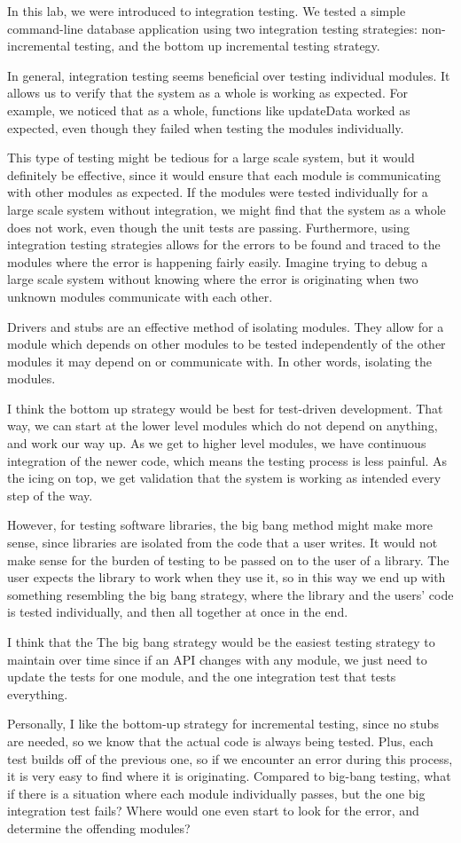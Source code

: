 In this lab, we were introduced to integration testing.  We tested a simple
command-line database application using two integration testing strategies:
non-incremental testing, and the bottom up incremental testing strategy.

In general, integration testing seems beneficial over testing individual
modules. It allows us to verify that the system as a whole is working as
expected. For example, we noticed that as a whole, functions like updateData
worked as expected, even though they failed when testing the modules
individually. 

This type of testing might be tedious for a large scale system, but it would
definitely be effective, since it would ensure that each module is communicating
with other modules as expected. If the modules were tested individually for a
large scale system without integration, we might find that the system as a whole
does not work, even though the unit tests are passing. Furthermore, using
integration testing strategies allows for the errors to be found and traced to
the modules where the error is happening fairly easily. Imagine trying to debug
a large scale system without knowing where the error is originating when two
unknown modules communicate with each other.

Drivers and stubs are an effective
method of isolating modules. They allow for a module which depends on other
modules to be tested independently of the other modules it may depend on or
communicate with. In other words, isolating the modules.

I think the bottom up strategy would be best for
test-driven development. That way, we can start at the lower level modules which
do not depend on anything, and work our way up. As we get to higher level
modules, we have continuous integration of the newer code, which means the
testing process is less painful. As the icing on top, we get validation that
the system is working as intended every step of the way.

However, for testing software libraries, the
big bang method might make more sense, since libraries are isolated from the
code that a user writes. It would not make sense for the burden of testing to be
passed on to the user of a library. The user expects the library to work when
they use it, so in this way we end up with something resembling the big bang
strategy, where the library and the users' code is tested individually, and then
all together at once in the end. 

I think that the The big bang strategy would be
the easiest testing strategy to maintain over time since if an API changes with
any module, we just need to update the tests for one module, and the one
integration test that tests everything. 

Personally, I like the bottom-up
strategy for incremental testing, since no stubs are needed, so we know that the
actual code is always being tested. Plus, each test builds off of the previous
one, so if we encounter an error during this process, it is very easy to find
where it is originating. Compared to big-bang testing, what if there is a
situation where each module individually passes, but the one big integration
test fails? Where would one even start to look for the error, and determine the
offending modules?
